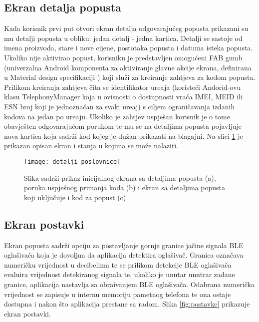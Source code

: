\subsection{Ekran detalja popusta}

Kada korisnik prvi put otvori ekran detalja odgovaraju\'{c}eg popusta prikazani su mu detalji popusta u obliku: jedan detalj -  jedna kartica. Detalji se sastoje od imena proizvoda, stare i nove cijene, postotaka popusta i datuma isteka popusta. Ukoliko nije aktivirao popust, korisniku je predstavljen omogu\'{c}eni FAB gumb (univerzalna Android komponenta za aktiviranje glavne akcije ekrana, definirana u Material design specifikaciji \cite{materialDesign}) koji slu\v{z}i za kreiranje zahtjeva za kodom popusta. Prilikom kreiranja zahtjeva \v{c}ita se identifikator ure\dj aja (koriste\'{c}i Andorid-ovu klasu TelephonyManager \cite{telephonyManager} koja u ovisnosti o dostupnosti vra\'{c}a IMEI, MEID ili ESN broj koji je jednozna\v{c}an za svaki ure\dj aj) s ciljem ograni\v{c}avanja izdanih kodova na jedan po ure\dj aju. Ukoliko je zahtjev uspje\v{s}an korisnik je o tome obavje\v{s}ten odgovaraju\'{c}om porukom te mu se na detaljima popusta pojavljuje nova kartica koja sadr\v{z}i kod kojeg je du\v{z}an prikazati na blagajni. Na slici \ref{fig:detalji_poslovnice} je prikazan opisan ekran i stanja u kojima se mo\v{z}e nalaziti.



\begin{figure}[!htbp]
	\begin{center}
 \texttt{[image: detalji\_poslovnice]}
 \caption{Slika sadr\v{z}i prikaz inicijalnog ekrana sa detaljima popusta (a), poruka uspje\v{s}nog primanja koda (b) i ekran sa detaljima popusta koji uklju\v{c}uje i kod za popust (c)}
 \label{fig:detalji_poslovnice}
	\end{center}
\end{figure}


\subsection{Ekran postavki}
Ekran popusta sadr\v{z}i opciju za postavljanje gornje granice ja\v{c}ine signala BLE ogla\v{s}iva\v{c}a koja je dovoljna da aplikacija detektira ogla\v{s}iva\v{c}. Granica ozna\v{c}ava numeri\v{c}ku vrijednost u decibelima te se prilikom detekcije BLE ogla\v{s}iva\v{c}a evaluira vrijednost detekiranog signala te, ukoliko je unutar unutrar zadane granice, aplikacija nastavlja sa obra\dj ivanjem BLE ogla\v{s}iva\v{c}a.
Odabrana numeri\v{c}ka vrijednost se zapisuje u internu memoriju pametnog telefona te ona ostaje dostupna i nakon \v{s}to aplikacija prestane sa radom. Slika \ref{fig:postavke} prikazuje ekran postavki.


